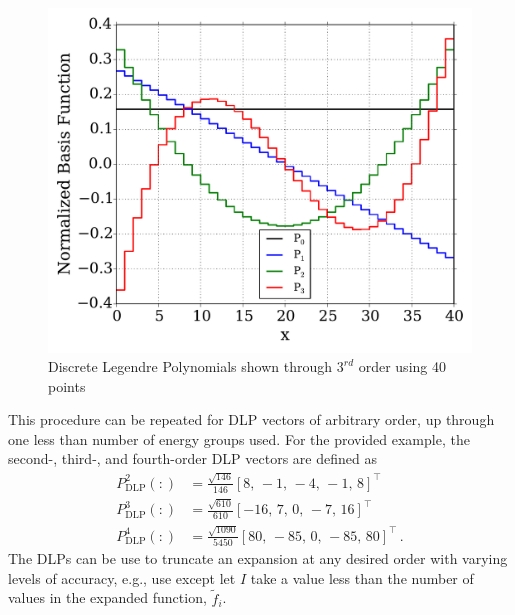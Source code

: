 \begin{figure}[pt]
  \centering
  \includegraphics[trim=.1cm .25cm .1cm .4cm, clip=true,
  totalheight=0.35\textheight]{Figures/DLP_basis}
  \caption{Discrete Legendre Polynomials shown through $3^{rd}$ order using 40 
points}
  \label{fig:DLP}
\end{figure}

This procedure can be repeated for DLP vectors of arbitrary order, up through 
one less than number of energy groups used. For the provided example, the 
second-, third-, and 
fourth-order DLP vectors are defined as
\begin{equation}
    \begin{split}
        P_{\text{DLP}}^2(:)  &= \frac{\sqrt{146}}{146} 
        [8,\,-1,\,-4,\,-1,\,8]^{\intercal} \\
        P_{\text{DLP}}^3(:)  &= \frac{\sqrt{610}}{610} 
        [-16,\,7,\,0,\,-7,\,16]^{\intercal} \\
        P_{\text{DLP}}^4(:)  &= \frac{\sqrt{1090}}{5450} 
        [80,\,-85,\,0,\,-85,\,80]^{\intercal}\, .
    \end{split}
\end{equation}
The DLPs can be use to truncate an expansion at any desired order 
with varying levels of accuracy, e.g., use  except let $I$ 
take 
a value less than the number of values in the expanded function, $\tilde{f}_i$.

